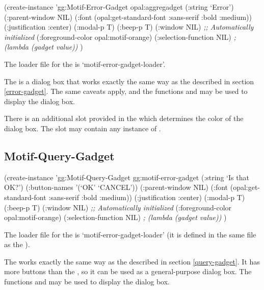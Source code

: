 \begin{group}
\begin{programexample}
(create-instance 'gg:Motif-Error-Gadget opal:aggregadget
   (:string `Error')
   (:parent-window NIL)
   (:font (opal:get-standard-font :sans-serif :bold :medium))
   (:justification :center)
   (:modal-p T)
   (:beep-p T)
   (:window NIL)        {\it ;; Automatically initialized}
   (:foreground-color opal:motif-orange)
   (:selection-function NIL)   {\it ; (lambda (gadget value))}
   )
\end{programexample}
\end{group}

The loader file for the  is `motif-error-gadget-loader'.

The  is a dialog box that works exactly the same way
as the  described in section \ref{error-gadget}.  The same
caveats apply, and the functions  and
 may be used to display the dialog box.

There is an additional slot provided in the  which
determines the color of the dialog box.  The  slot may
contain any instance of .



\begin{group}
\section{Motif-Query-Gadget}
\label{motif-query-gadget}
\begin{programexample}
(create-instance 'gg:Motif-Query-Gadget gg:motif-error-gadget
   (:string `Is that OK?')
   (:button-names '(`OK' `CANCEL'))
   (:parent-window NIL)
   (:font (opal:get-standard-font :sans-serif :bold :medium))
   (:justification :center)
   (:modal-p T)
   (:beep-p T)
   (:window NIL)        {\it ;; Automatically initialized}
   (:foreground-color opal:motif-orange)
   (:selection-function NIL)   {\it ; (lambda (gadget value))}
   )
\end{programexample}
\end{group}

The loader file for the  is `motif-error-gadget-loader'
(it is defined in the same file as the ).

The  works exactly the same way
as the  described in section \ref{query-gadget}.
It has more buttons than the , so it can be used as
a general-purpose dialog box.
The functions  and 
may be used to display the dialog box.

